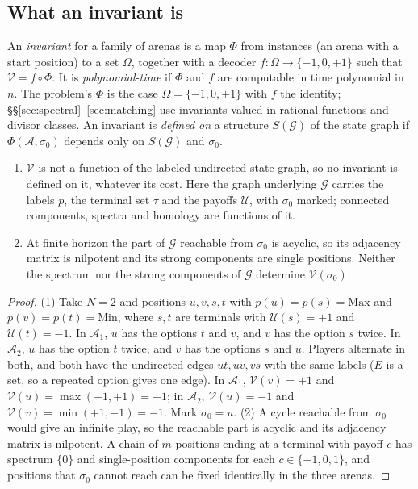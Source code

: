 \documentclass[final]{siamart0516}
\numberwithin{theorem}{section}
\numberwithin{equation}{section}
\theoremstyle{siamnonum}
\renewenvironment{definition*}{\definitionstar}{\enddefinitionstar}
\theoremstyle{plain}
\newcommand{\val}{\mathcal{V}}            %
\newcommand{\pay}{\mathcal{U}}            %
\newcommand{\SG}{\mathcal{G}}             %
\newcommand{\arena}{\mathcal{A}}          %
\begin{document}
\subsection{What an invariant is}
\begin{definition*}
An \emph{invariant} for a family of arenas is a map $\Phi$ from instances (an arena with a start position) to a set $\Omega$, together with a decoder $f\colon\Omega\to\{-1,0,+1\}$ such that $\val=f\circ\Phi$. It is \emph{polynomial-time} if $\Phi$ and $f$ are computable in time polynomial in $n$. The problem's $\Phi$ is the case $\Omega=\{-1,0,+1\}$ with $f$ the identity; \S\S\ref{sec:spectral}--\ref{sec:matching} use invariants valued in rational functions and divisor classes. An invariant is \emph{defined on} a structure $S(\SG)$ of the state graph if $\Phi(\arena,\sigma_0)$ depends only on $S(\SG)$ and $\sigma_0$.
\end{definition*}

\begin{proposition}\label{prop:blind}
\begin{enumerate}[label=\textup{(\arabic*)}]
\item $\val$ is not a function of the labeled undirected state graph, so no invariant is defined on it, whatever its cost. Here the graph underlying $\SG$ carries the labels $p$, the terminal set $\tau$ and the payoffs $\pay$, with $\sigma_0$ marked; connected components, spectra and homology are functions of it.
\item At finite horizon the part of $\SG$ reachable from $\sigma_0$ is acyclic, so its adjacency matrix is nilpotent and its strong components are single positions. Neither the spectrum nor the strong components of $\SG$ determine $\val(\sigma_0)$.
\end{enumerate}
\end{proposition}

\begin{proof}
(1) Take $N=2$ and positions $u,v,s,t$ with $p(u)=p(s)=\mathrm{Max}$ and $p(v)=p(t)=\mathrm{Min}$, where $s,t$ are terminals with $\pay(s)=+1$ and $\pay(t)=-1$. In $\arena_1$, $u$ has the options $t$ and $v$, and $v$ has the option $s$ twice. In $\arena_2$, $u$ has the option $t$ twice, and $v$ has the options $s$ and $u$. Players alternate in both, and both have the undirected edges $ut,uv,vs$ with the same labels ($E$ is a set, so a repeated option gives one edge). In $\arena_1$, $\val(v)=+1$ and $\val(u)=\max(-1,+1)=+1$; in $\arena_2$, $\val(u)=-1$ and $\val(v)=\min(+1,-1)=-1$. Mark $\sigma_0=u$.
(2) A cycle reachable from $\sigma_0$ would give an infinite play, so the reachable part is acyclic and its adjacency matrix is nilpotent. A chain of $m$ positions ending at a terminal with payoff $c$ has spectrum $\{0\}$ and single-position components for each $c\in\{-1,0,1\}$, and positions that $\sigma_0$ cannot reach can be fixed identically in the three arenas.
\end{proof}
\end{document}
